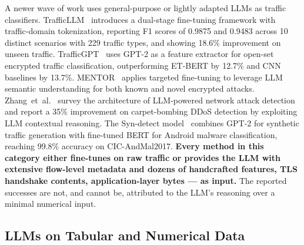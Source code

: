 \documentclass[conference]{IEEEtran}
\begin{document}
A newer wave of work uses general-purpose or lightly adapted LLMs as traffic classifiers. TrafficLLM~\cite{cui2025trafficllm} introduces a dual-stage fine-tuning framework with traffic-domain tokenization, reporting F1 scores of 0.9875 and 0.9483 across 10 distinct scenarios with 229 traffic types, and showing 18.6\% improvement on unseen traffic. TrafficGPT~\cite{ginige2024trafficgpt} uses GPT-2 as a feature extractor for open-set encrypted traffic classification, outperforming ET-BERT by 12.7\% and CNN baselines by 13.7\%. MENTOR~\cite{jia2025mentor} applies targeted fine-tuning to leverage LLM semantic understanding for both known and novel encrypted attacks. Zhang~et~al.~\cite{zhang2025llmntd} survey the architecture of LLM-powered network attack detection and report a 35\% improvement on carpet-bombing DDoS detection by exploiting LLM contextual reasoning. The Syn-detect model~\cite{syndetect2025} combines GPT-2 for synthetic traffic generation with fine-tuned BERT for Android malware classification, reaching 99.8\% accuracy on CIC-AndMal2017. \textbf{Every method in this category either fine-tunes on raw traffic or provides the LLM with extensive flow-level metadata and dozens of handcrafted features, TLS handshake contents, application-layer bytes --- as input.} The reported successes are not, and cannot be, attributed to the LLM's reasoning over a minimal numerical input.

\subsection{LLMs on Tabular and Numerical Data}
\end{document}
